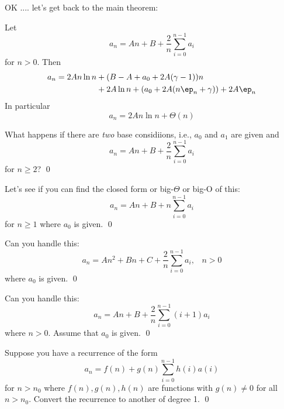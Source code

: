 OK .... let's get back to the main theorem:

\begin{thm}
  Let
  \[
  a_n = An + B + \frac{2}{n} \sum_{i=0}^{n-1} a_i
  \]
  for $n > 0$.
  Then 
  \begin{align*}
  a_n = 2A n \ln n &+ (B - A + a_0 + 2A(\gamma - 1)) n \\
    &+ 2A\ln n 
 + \left(a_0 + 2A(n \ep_n + \gamma)\right) 
 + 2A\ep_n
 \end{align*}
 In particular
   \[
  a_n = 2A n \ln n + \Theta(n)
  \]

\end{thm}

\proof


\newpage
\begin{ex}
What happens if there are \textit{two} base considiions, i.e.,
$a_0$ and $a_1$ are given and
\[
a_n = An + B + \frac{2}{n} \sum_{i=0}^{n-1} a_i
\]
for $n \geq 2$?
\qed
\end{ex}

\newpage
\begin{ex}
  Let's see if you can find the closed form or big-$\Theta$ or big-O of this:
  \[
  a_n = An + B + n \sum_{i=0}^{n-1} a_i
  \]
  for $n \geq 1$ where $a_0$ is given.
\qed
\end{ex}

\newpage
\begin{ex}
  Can you handle this:
  \[
  a_n = An^2 + Bn + C + \frac{2}{n} \sum_{i=0}^{n-1} a_i, \,\,\,\,\, n > 0
  \]
  where $a_0$ is given.
  \qed
\end{ex}


\newpage
\begin{ex}
  Can you handle this:
  \[
  a_n = An + B + \frac{2}{n} \sum_{i=0}^{n-1} (i + 1) a_i
  \]
  where $n > 0$. Assume that $a_0$ is given.
  \qed
\end{ex}

\newpage
\begin{ex}
  Suppose you have a recurrence of the form
  \[
  a_n = f(n) + g(n) \sum_{i=0}^{n-1} h(i) a(i)
  \]
  for $n > n_0$ 
  where $f(n), g(n), h(n)$ are functions with $g(n) \neq 0$ for all $n > n_0$.
  Convert the recurrence to another of degree 1.
  \qed
\end{ex}

\SOLUTION


